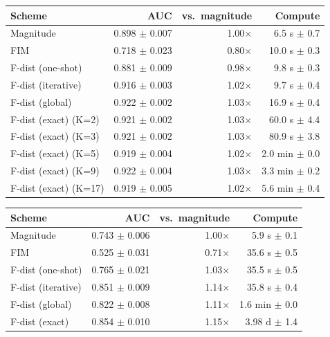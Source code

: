 \begin{tabular}{lrrr}
\toprule
Scheme & AUC & vs.\ magnitude & Compute \\
\midrule
Magnitude & 0.898 $\pm$ 0.007 & 1.00$\times$ & 6.5 s $\pm$ 0.7 \\
FIM & 0.718 $\pm$ 0.023 & 0.80$\times$ & 10.0 s $\pm$ 0.3 \\
F-dist (one-shot) & 0.881 $\pm$ 0.009 & 0.98$\times$ & 9.8 s $\pm$ 0.3 \\
F-dist (iterative) & 0.916 $\pm$ 0.003 & 1.02$\times$ & 9.7 s $\pm$ 0.4 \\
F-dist (global) & 0.922 $\pm$ 0.002 & 1.03$\times$ & 16.9 s $\pm$ 0.4 \\
F-dist (exact) (K=2) & 0.921 $\pm$ 0.002 & 1.03$\times$ & 60.0 s $\pm$ 4.4 \\
F-dist (exact) (K=3) & 0.921 $\pm$ 0.002 & 1.03$\times$ & 80.9 s $\pm$ 3.8 \\
F-dist (exact) (K=5) & 0.919 $\pm$ 0.004 & 1.02$\times$ & 2.0 min $\pm$ 0.0 \\
F-dist (exact) (K=9) & 0.922 $\pm$ 0.004 & 1.03$\times$ & 3.3 min $\pm$ 0.2 \\
F-dist (exact) (K=17) & 0.919 $\pm$ 0.005 & 1.02$\times$ & 5.6 min $\pm$ 0.4 \\
\bottomrule
\end{tabular}

\begin{tabular}{lrrr}
\toprule
Scheme & AUC & vs.\ magnitude & Compute \\
\midrule
Magnitude & 0.743 $\pm$ 0.006 & 1.00$\times$ & 5.9 s $\pm$ 0.1 \\
FIM & 0.525 $\pm$ 0.031 & 0.71$\times$ & 35.6 s $\pm$ 0.5 \\
F-dist (one-shot) & 0.765 $\pm$ 0.021 & 1.03$\times$ & 35.5 s $\pm$ 0.5 \\
F-dist (iterative) & 0.851 $\pm$ 0.009 & 1.14$\times$ & 35.8 s $\pm$ 0.4 \\
F-dist (global) & 0.822 $\pm$ 0.008 & 1.11$\times$ & 1.6 min $\pm$ 0.0 \\
F-dist (exact) & 0.854 $\pm$ 0.010 & 1.15$\times$ & 3.98 d $\pm$ 1.4 \\
\bottomrule
\end{tabular}

